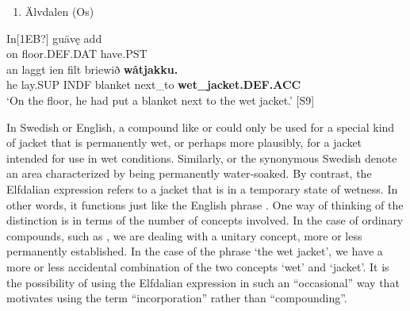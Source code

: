 \begin{enumerate} %
\item 
Älvdalen (Os)

\end{enumerate} %
\ea\label{}
\gll In[1EB?]  guävę  add\\


on  floor.DEF.DAT  have.PST\\ %


\ea\label{}
\gll an  laggt  ien  filt  briewið  \textbf{wåtjakku.}\\


he  lay.SUP  INDF  blanket  next\_to  \textbf{wet\_jacket.DEF.ACC}\\ %


 ‘On the floor, he had put a blanket next to the wet jacket.’ [S9]
\z

In Swedish or English, a compound like  or  could only be used for a special kind of jacket that is permanently wet, or perhaps more plausibly, for a jacket intended for use in wet conditions. Similarly,  or the synonymous Swedish  denote an area characterized by being permanently water-soaked. By contrast, the Elfdalian expression refers to a jacket that is in a temporary state of wetness. In other words, it functions just like the English phrase . One way of thinking of the distinction is in terms of the number of concepts involved. In the case of ordinary compounds, such as , we are dealing with a unitary concept, more or less permanently established. In the case of the phrase ‘the wet jacket’, we have a more or less accidental combination of the two concepts ‘wet’ and ‘jacket’. It is the possibility of using the Elfdalian expression in such an “occasional” way that motivates using the term “incorporation” rather than “compounding”. 

